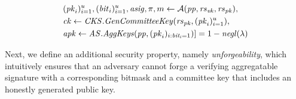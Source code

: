 \begin{definition}
\begin{align*}
& (\mathit{pk}_{i})_{i=1}^u, (\mathit{bit}_{i})_{i=1}^u, \mathit{asig}, \pi, m  \leftarrow \mathcal{A}(\mathit{pp}, \mathit{rs}_{\mathit{vk}}, \mathit{rs}_{\mathit{pk}}), \\
&  \mathit{ck} \leftarrow \mathit{CKS.GenCommitteeKey}(\mathit{rs}_{\mathit{pk}}, (\mathit{pk}_{i})_{i=1}^u), \\
& \mathit{apk} \leftarrow \mathit{AS.AggKeys}( \mathit{pp},( \mathit{pk}_{i})_{i:\mathit{bit_i}=1})] = 1 - \mathit{negl}(\lambda)
\end{align*}
\end{definition}

\noindent Next, we define an additional security property, namely \emph{unforgeability}, which intuitively ensures that an adversary 
cannot forge a verifying aggregatable signature with a corresponding bitmask and a committee key that includes an honestly generated public key.\\
\vspace{-0.05in}

